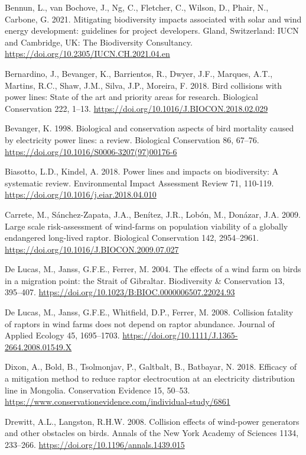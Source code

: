 \documentclass[
  oneside]{scrbook}
\begin{document}
Bennun, L., van Bochove, J., Ng, C., Fletcher, C., Wilson, D., Phair, N., Carbone, G. 2021. Mitigating biodiversity impacts associated with solar and wind energy development: guidelines for project developers. Gland, Switzerland: IUCN and Cambridge, UK: The Biodiversity Consultancy. \url{https://doi.org/10.2305/IUCN.CH.2021.04.en}

Bernardino, J., Bevanger, K., Barrientos, R., Dwyer, J.F., Marques, A.T., Martins, R.C., Shaw, J.M., Silva, J.P., Moreira, F. 2018. Bird collisions with power lines: State of the art and priority areas for research. Biological Conservation 222, 1--13. \url{https://doi.org/10.1016/J.BIOCON.2018.02.029}

Bevanger, K. 1998. Biological and conservation aspects of bird mortality caused by electricity power lines: a review. Biological Conservation 86, 67--76. \url{https://doi.org/10.1016/S0006-3207(97)00176-6}

Biasotto, L.D., Kindel, A. 2018. Power lines and impacts on biodiversity: A systematic review. Environmental Impact Assessment Review 71, 110-119. \url{https://doi.org/10.1016/j.eiar.2018.04.010}

Carrete, M., Sánchez-Zapata, J.A., Benítez, J.R., Lobón, M., Donázar, J.A. 2009. Large scale risk-assessment of wind-farms on population viability of a globally endangered long-lived raptor. Biological Conservation 142, 2954--2961. \url{https://doi.org/10.1016/J.BIOCON.2009.07.027}

De Lucas, M., Janss, G.F.E., Ferrer, M. 2004. The effects of a wind farm on birds in a migration point: the Strait of Gibraltar. Biodiversity \& Conservation 13, 395--407. \url{https://doi.org/10.1023/B:BIOC.0000006507.22024.93}

De Lucas, M., Janss, G.F.E., Whitfield, D.P., Ferrer, M. 2008. Collision fatality of raptors in wind farms does not depend on raptor abundance. Journal of Applied Ecology 45, 1695--1703. \url{https://doi.org/10.1111/J.1365-2664.2008.01549.X}

Dixon, A., Bold, B., Tsolmonjav, P., Galtbalt, B., Batbayar, N. 2018. Efficacy of a mitigation method to reduce raptor electrocution at an electricity distribution line in Mongolia. Conservation Evidence 15, 50--53. \url{https://www.conservationevidence.com/individual-study/6861}

Drewitt, A.L., Langston, R.H.W. 2008. Collision effects of wind-power generators and other obstacles on birds. Annals of the New York Academy of Sciences 1134, 233--266. \url{https://doi.org/10.1196/annals.1439.015}
\end{document}
